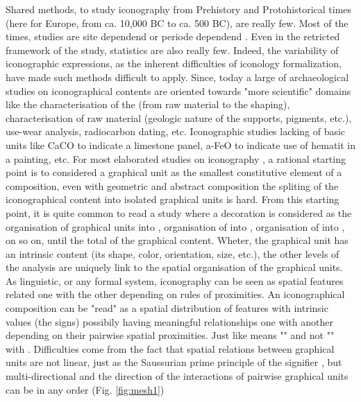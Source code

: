 \documentclass[article]{jss}
\begin{document}
Shared methods, to study iconography from Prehistory and Protohistorical times (here for Europe, from ca. 10,000 BC to ca. 500 BC), are really few. Most of the times, studies are site dependend or periode dependend \citep{LeroiGourhan92}. Even in the retricted framework of the study, statistics are also really few. Indeed, the variability of iconographic expressions, as the inherent difficulties of iconology formalization, have made such methods difficult to apply. Since, today a large of archaeological studies on iconographical contents are oriented towards "more scientific" domains like the characterisation of the  (from raw material to the shaping), characterisation of raw material (geologic nature of the supports, pigments, etc.), use-wear analysis, radiocarbon dating, etc. Iconographic studies lacking of basic units like CaCO to indicate a limestone panel, a-FeO to indicate use of hematit in a painting, etc. For most elaborated studies on iconography , a rational starting point is to considered a graphical unit as the smallest constitutive element of a composition, even with geometric and abstract composition the spliting of the iconographical content into isolated graphical units is hard. From this starting point, it is quite common to read a study where a decoration is considered as the organisation of graphical units into , organisation of  into , organisation of  into , on so on, until the total  of the graphical content. Wheter, the graphical unit has an intrinsic content (its shape, color, orientation, size, etc.), the other levels of the analysis are uniquely link to the spatial organisation of the graphical units. As linguistic, or any formal system, iconography can be seen as spatial features related one with the other depending on rules of proximities. An iconographical composition can be "read" as a spatial distribution of features with intrinsic values (the signs) possibily having meaningful relationships one with another depending on their pairwise spatial proximities. Just like  means "" and not "" with . Difficulties come from the fact that spatial relations between graphical units are not linear, just as the Saussurian prime principle of the signifier \cite{Saussure89}, but multi-directional and the direction of the interactions of pairwise graphical units can be in any order (Fig. \ref{fig:mesh1})
\end{document}
